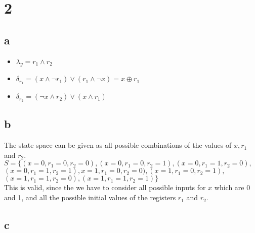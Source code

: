 \documentclass[11pt]{article}
\begin{document}
\newpage
\section{2}

\subsection{a}

\begin{itemize}
	\item $\lambda_y = r_1 \land r_2$
	\item $\delta_{r_1} = (x \land \lnot r_1) \lor (r_1 \land \lnot x) = x \oplus r_1$
	\item $\delta_{r_2} = (\lnot x \land r_2) \lor (x \land r_1)$
\end{itemize}

\subsection{b}

The state space can be given as all possible combinations of the values of $x, r_1$ and $r_2$.\\

$S = \{(x=0, r_1=0, r_2=0),(x=0, r_1=0, r_2=1),(x=0, r_1=1, r_2=0),$\\
	\hspace*{1cm}$(x=0, r_1=1, r_2=1),x=1, r_1=0, r_2=0),(x=1, r_1=0, r_2=1),$\\
    \hspace*{1cm}$(x=1, r_1=1, r_2=0),(x=1, r_1=1, r_2=1)\}$\\
	   
This is valid, since the we have to consider all possible inputs for $x$ which are 0 and 1, and
all the possible initial values of the registers $r_1$ and $r_2$.
										
\subsection{c}
\end{document}
